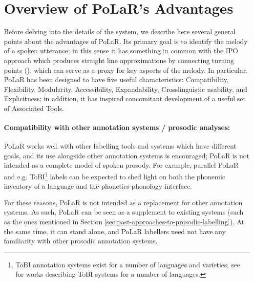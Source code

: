 \section{Overview of PoLaR’s Advantages}\label{sec:overview-of-PoLaRs-advantages}
Before delving into the details of the system, we describe here several general points about the advantages of PoLaR. Its primary goal is to identify the melody of a spoken utterance; in this sense it has something in common with the IPO approach \DIFdelbegin \DIFdel{, }\DIFdelend \DIFaddbegin {}\DIFaddend which produces straight line approximations by connecting turning points (\citealt{t-hart-90}), which can serve as a proxy for key aspects of the melody.  In particular, PoLaR has been designed to have five useful characteristics: Compatibility, Flexibility, Modularity, Accessibility, Expandability, Crosslinguistic usability, and Explicitness; in addition, it has inspired concomitant development of a useful set of Associated Tools. 

\paragraph{Compatibility with other annotation systems / prosodic analyses:}
PoLaR works well with other labelling tools and systems which have different goals, and its use alongside other annotation systems is encouraged; PoLaR is not intended as a complete model of spoken prosody.  For example, parallel PoLaR and e.g. ToBI\footnote{ToBI annotation systems exist for a number of languages and varieties; see \citealt{jun05, jun14} for works describing ToBI systems for a number of languages.} labels can be expected to shed light on both the phonemic inventory of a language and the phonetics-phonology interface. 

For these reasons, PoLaR is not intended as a replacement for other annotation systems. As such, PoLaR can be seen as a supplement to existing systems (such as the ones mentioned in Section \ref{sec:past-approaches-to-prosodic-labelling}). At the same time, it can stand alone, and PoLaR labellers need not have any familiarity with other prosodic annotation systems.

